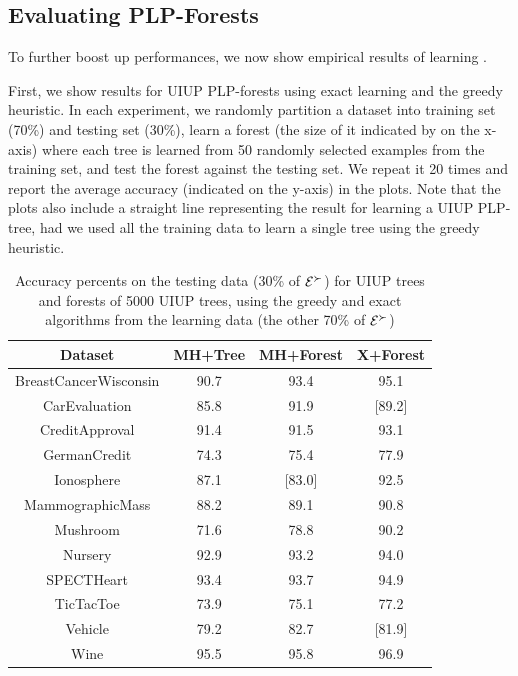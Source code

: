 \subsection{Evaluating PLP-Forests}
To further boost up performances, we now show empirical results
of learning .

First, we show results for UIUP PLP-forests using exact learning
and the greedy heuristic.
In each experiment, we randomly partition a dataset into training
set (70\%) and testing set (30\%), learn a forest (the size of it
indicated by on the x-axis) where
each tree is learned from 50 randomly selected examples from the
training set, and test the forest against the testing set.
We repeat it 20 times and report the average accuracy (indicated on
the y-axis) in the plots.
Note that the plots also include a straight line representing
the result for learning a UIUP PLP-tree, had we used all the
training data to learn a single tree using the greedy heuristic.

\begin{table}
  \centering
  \small
  \begin{tabular}{ |c||c|c|c| }
    \hline
    Dataset          				& MH+Tree & MH+Forest & X+Forest\\
    \hline \hline
    BreastCancerWisconsin   & 90.7 & 93.4 & 95.1 \\
    \hline                                     
    CarEvaluation           & 85.8 & 91.9 & [89.2] \\
    \hline                                     
    CreditApproval          & 91.4 & 91.5 & 93.1 \\
    \hline                                     
    GermanCredit            & 74.3 & 75.4 & 77.9 \\
    \hline                                     
    Ionosphere              & 87.1 & [83.0] & 92.5 \\
    \hline                                     
    MammographicMass        & 88.2 & 89.1 & 90.8 \\
    \hline                                     
    Mushroom                & 71.6 & 78.8 & 90.2 \\
    \hline                                     
    Nursery                 & 92.9 & 93.2 & 94.0 \\
    \hline                                     
    SPECTHeart              & 93.4 & 93.7 & 94.9 \\
    \hline                                     
    TicTacToe               & 73.9 & 75.1 & 77.2 \\
    \hline                                     
    Vehicle                 & 79.2 & 82.7 & [81.9] \\
    \hline                                     
    Wine                    & 95.5 & 95.8 & 96.9 \\
    \hline
  \end{tabular}
  \caption{Accuracy percents on the testing data (30\% of $\mathcal{E}^\succ$)
					 for UIUP trees and forests of 5000 UIUP trees, 
					 using the greedy and exact algorithms from the learning 
					 data (the other 70\% of $\mathcal{E}^\succ$)}
  \label{tbl:forests1}
\end{table}

